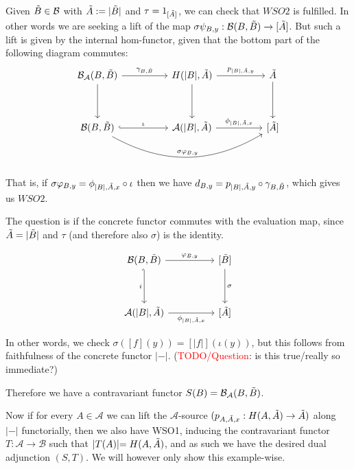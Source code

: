 \documentclass[12pt,a4paper]{article}
\def\HomA{\ensuremath\mathcal{A}}
\def\HomB{\ensuremath\mathcal{B}}
\def\t{\ensuremath\tilde}
\begin{document}
Given $\t B \in \mathcal{B}$ with $\t A := \lvert \t B \lvert $ and $\tau = 1_{[\t A]}$, we can check that $WSO2$ is fulfilled. In other words we are seeking a lift of the map $\sigma \psi_{B,y}: \HomB(B, \t B) \to [\t A]$. But such a lift is given by the internal hom-functor, given that the bottom part of the following diagram commutes:
\[\begin{tikzcd}
	{\HomB_\mathcal{A}(B, \t B)} && {H(\lvert B\lvert, \t A)} && {\t A} \\
	\\
	{\HomB(B, \t B)} && {\HomA(\lvert B \lvert , \t A) } && {[\t A]}
	\arrow["{\gamma_{B, \t B}}", from=1-1, to=1-3]
	\arrow[from=1-1, to=3-1]
	\arrow["{p_{\lvert B \lvert, \t A, y}}", from=1-3, to=1-5]
	\arrow[from=1-3, to=3-3]
	\arrow[from=1-5, to=3-5]
	\arrow["\iota", hook, from=3-1, to=3-3]
	\arrow["{\sigma \varphi_{B,y}}", bend right, from=3-1, to=3-5]
	\arrow["{\phi_{\lvert B\lvert , \t A,x }}", from=3-3, to=3-5]
\end{tikzcd}\]

That is, if $\sigma \varphi_{B,y} = \phi_{\lvert B\lvert, \t A, x} \circ \iota$ then we have $d_{B, y} = p_{\lvert B \lvert, \t A, y} \circ \gamma_{B, \t B}$, which gives us $WSO2$. 

The question is if the concrete functor commutes with the evaluation map, since $\t A = \lvert \t B \lvert $ and $\tau$ (and therefore also $\sigma$) is the identity.

\[\begin{tikzcd}
	{\HomB(B, \t B)} && {[\t B]} \\
	\\
	{\HomA(\lvert B \lvert, \t A) } && {[\t A]}
	\arrow["{\varphi_{B, y}}", from=1-1, to=1-3]
	\arrow["i"', hook', from=1-1, to=3-1]
	\arrow["\sigma", from=1-3, to=3-3]
	\arrow["{\phi_{\lvert B \lvert, \t A, x}}"', from=3-1, to=3-3]
\end{tikzcd}\]

In other words, we check $\sigma([f](y)) = [\lvert f \lvert ](\iota(y))$, but this follows from faithfulness of the concrete functor $\lvert - \lvert $. (\textcolor{red}{TODO/Question}: is this true/really so immediate?)

Therefore we have a contravariant functor $S(B) = \HomB_\mathcal{A}(B, \t B)$. 

Now if for every $A \in \mathcal{A}$ we can lift the $\mathcal{A}$-source $(p_{A, \t A, x}: H(A, \t A) \to \t A)$ along $\lvert - \lvert$ functorially, then we also have WSO1, inducing the contravariant functor $T: \mathcal{A} \to \mathcal{B}$ such that $\lvert T(A) \lvert = H(A, \t A)$, and as such we have the desired dual adjunction $(S, T)$. We will however only show this example-wise. 
\end{document}
